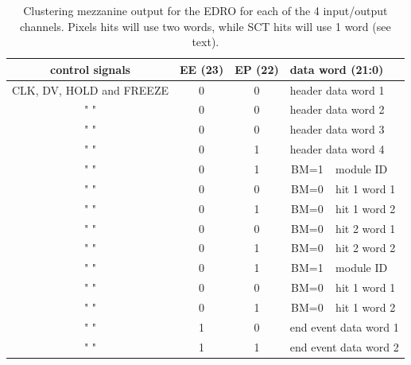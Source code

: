 \documentclass[10pt]{article}
\numberwithin{figure}{section}
\numberwithin{equation}{section}
\numberwithin{table}{section}
\newcommand{\0}{\phantom{0}}
\begin{document}
\begin{table}[h]
\begin{tabular}{c|c|c|c|l}
control signals & EE (23) & EP (22) & \multicolumn{2}{l}{data word (21:0)}    \\ \hline \hline
CLK, DV, HOLD and FREEZE & 0 & 0 & \multicolumn{2}{l}{header data word 1} \\
 "   "  & 0 & 0 & \multicolumn{2}{l}{header data word 2} \\ 
 "   "  & 0 & 0 & \multicolumn{2}{l}{header data word 3} \\ 
 "   "  & 0 & 1 & \multicolumn{2}{l}{header data word 4} \\ \hline
 "   "  & 0 & 1 & BM=1 & module ID \\ \hline
 "   "  & 0 & 0 & BM=0 & hit 1 word 1 \\  
 "   "  & 0 & 1 & BM=0 & hit 1 word 2 \\  \hline
 "   "  & 0 & 0 & BM=0 & hit 2 word 1 \\  
 "   "  & 0 & 1 & BM=0 & hit 2 word 2 \\  \hline
 "   "  & 0 & 1 & BM=1 & module ID \\ \hline
 "   "  & 0 & 0 & BM=0 & hit 1 word 1 \\  
 "   "  & 0 & 1 & BM=0 & hit 1 word 2 \\  \hline
 "   "  & 1 & 0 & \multicolumn{2}{l}{end event data word 1} \\
 "   "  & 1 & 1 & \multicolumn{2}{l}{end event data word 2}  \\
\end{tabular}
\caption{\label{tab:clustering_outputEDRO}Clustering mezzanine output for the EDRO for each of the 4 input/output channels. Pixels hits will use two words, while SCT hits will use 1 word (see text).}
\end{table}
\end{document}
